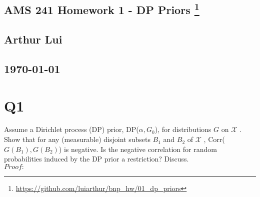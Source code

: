 \documentclass{article}
\begin{document}
\begin{center}
  \section*{\textbf{AMS 241 Homework 1 - DP Priors}
    \footnote{\url{https://github.com/luiarthur/bnp_hw/01_dp_priors}}
  } 
  \subsection*{\textbf{Arthur Lui}}
  \subsection*{\noindent\today}
\end{center}

\noindent
\section*{Q1}
Assume a Dirichlet process (DP) prior, DP($\alpha,G_0$), for distributions $G$
on $\mathcal X$ . Show that for any (measurable) disjoint subsets $B_1$ and
$B_2$ of $\mathcal X$ , Corr($G(B_1),G(B_2)$) is negative. Is the negative
correlation for random probabilities induced by the DP prior a restriction?
Discuss.\\

\noindent $Proof:$\\
\end{document}
